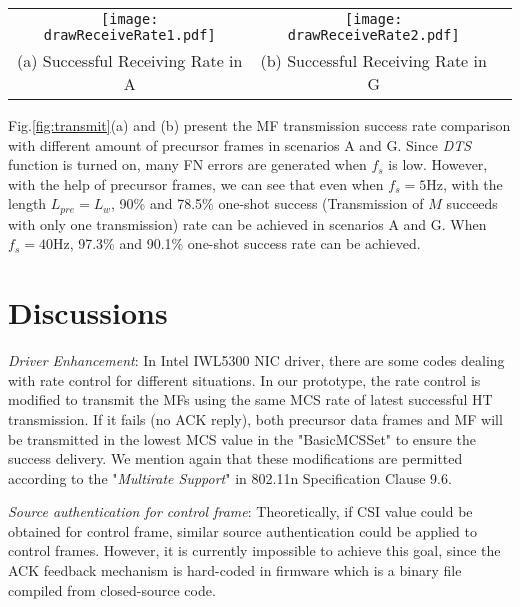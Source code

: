\documentclass[conference]{IEEEtran}
\begin{document}
\begin{figure*}
\begin{center}
\begin{tabular}{ccc}
  \hspace{-0.1in}\texttt{[image: drawReceiveRate1.pdf]}  &
  \texttt{[image: drawReceiveRate2.pdf]} & \hspace{-0.3in}\\
(a)  Successful Receiving Rate in A  & (b) Successful Receiving Rate in G \end{tabular}
\end{center}
\label{fig:transmit}
\vspace{-0.0in}
\end{figure*}

Fig.\ref{fig:transmit}(a) and (b) present the MF transmission success rate comparison with different amount of precursor frames in scenarios A and G. Since \textit{DTS} function is turned on, many FN errors are generated when $f_s$ is low. However, with the help of precursor frames, we can see that even when $f_s=5$Hz, with the length $L_{pre}=L_w$, 90\% and 78.5\% one-shot success (Transmission of $M$ succeeds with only one transmission) rate can be achieved in scenarios A and G. When $f_s=40$Hz, 97.3\% and 90.1\% one-shot success rate can be achieved. 


\section{Discussions}
\label{sec:discussion}

\textit{Driver Enhancement}:
In Intel IWL5300 NIC driver, there are some codes dealing with rate control for different situations.
In our prototype, the rate control is modified to transmit the MFs using the same MCS rate of latest successful HT transmission. If it fails (no ACK reply), both precursor data frames and MF will be transmitted in the lowest MCS value in the "BasicMCSSet" to ensure the success delivery. We mention again that these modifications are permitted according to the "\textit{Multirate Support}" in 802.11n Specification\cite{ieee2009ieee} Clause 9.6.


\textit{Source authentication for control frame}: Theoretically, if CSI value could be obtained for control frame, similar source authentication could be applied to control frames. However, it is currently impossible to achieve this goal, since the ACK feedback mechanism is hard-coded in firmware which is a binary file compiled from closed-source code.
\end{document}

